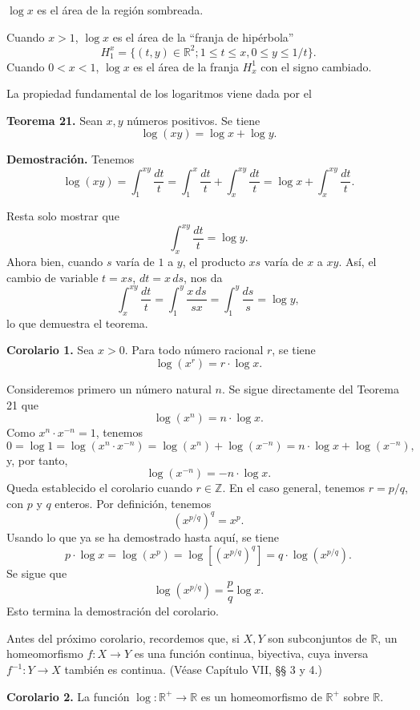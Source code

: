 \documentclass[12pt,oneside]{book}
\begin{document}
\(\log x\) es el área de la región sombreada.

Cuando \(x > 1\), \(\log x\) es el área de la “franja de hipérbola”
\[
H_1^x = \{(t, y) \in \mathbb{R}^2; 1 \leq t \leq x, 0 \leq y \leq 1/t\}.
\]
Cuando \(0 < x < 1\), \(\log x\) es el área de la franja \(H_x^1\) con el signo cambiado.

La propiedad fundamental de los logaritmos viene dada por el

\textbf{Teorema 21.} Sean \(x, y\) números positivos. Se tiene
\[
\log(xy) = \log x + \log y.
\]

\textbf{Demostración.} Tenemos
\[
\log(xy) = \int_1^{xy} \frac{dt}{t} = \int_1^x \frac{dt}{t} + \int_x^{xy} \frac{dt}{t} = \log x + \int_x^{xy} \frac{dt}{t}.
\]

Resta solo mostrar que
\[
\int_x^{xy} \frac{dt}{t} = \log y.
\]
Ahora bien, cuando \(s\) varía de \(1\) a \(y\), el producto \(xs\) varía de \(x\) a \(xy\). Así, el cambio de variable \( t = xs \), \( dt = x\,ds \), nos da
\[
\int_x^{xy} \frac{dt}{t} = \int_1^y \frac{x\,ds}{sx} = \int_1^y \frac{ds}{s} = \log y,
\]
lo que demuestra el teorema.

\textbf{Corolario 1.} Sea \( x > 0 \). Para todo número racional \( r \), se tiene
\[
\log(x^r) = r \cdot \log x.
\]

Consideremos primero un número natural \( n \). Se sigue directamente del Teorema 21 que
\[
\log(x^n) = n \cdot \log x.
\]
Como \( x^n \cdot x^{-n} = 1 \), tenemos
\[
0 = \log 1 = \log(x^n \cdot x^{-n}) = \log(x^n) + \log(x^{-n}) = n \cdot \log x + \log(x^{-n}),
\]
y, por tanto,
\[
\log(x^{-n}) = -n \cdot \log x.
\]
Queda establecido el corolario cuando \( r \in \mathbb{Z} \). En el caso general, tenemos \( r = p/q \), con \( p \) y \( q \) enteros. Por definición, tenemos
\[
(x^{p/q})^q = x^p.
\]
Usando lo que ya se ha demostrado hasta aquí, se tiene
\[
p \cdot \log x = \log(x^p) = \log[(x^{p/q})^q] = q \cdot \log(x^{p/q}).
\]
Se sigue que
\[
\log(x^{p/q}) = \frac{p}{q} \log x.
\]
Esto termina la demostración del corolario.

Antes del próximo corolario, recordemos que, si \( X, Y \) son subconjuntos de \( \mathbb{R} \), un homeomorfismo \( f: X \to Y \) es una función continua, biyectiva, cuya inversa \( f^{-1}: Y \to X \) también es continua. (Véase Capítulo VII, §§ 3 y 4.)

\textbf{Corolario 2.} La función \( \log: \mathbb{R}^+ \to \mathbb{R} \) es un homeomorfismo de \( \mathbb{R}^+ \) sobre \( \mathbb{R} \).
\end{document}
